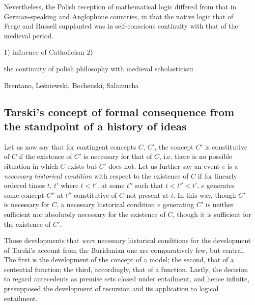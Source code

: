 \documentclass[]{article}
\begin{document}

Nevertheless, the Polish reception of mathematical logic differed from that in German-speaking and Anglophone countries, in that the native logic that of Frege and Russell supplanted was in self-conscious continuity with that of the medieval period.

1) influence of Catholicism
2) 

the continuity of polish philosophy with medieval scholasticism

Brentano, Le\'{s}niewski, Bochenski, Salamucha

\nocite{Moody1952} \nocite{Bochenski1956} 

\subsection{Tarski's concept of formal consequence from the standpoint of a history of ideas}
Let us now say that for contingent concepts $C$, $C'$, the concept $C'$ is constitutive of $C$ if the existence of $C'$ is necessary for that of $C$, i.e. there is no possible situation in which $C$ exists but $C'$ does not. Let us further say an event $e$ is a \textit{necessary historical condition} with respect to the existence of $C$ if for linearly ordered times $t$, $t'$ where $t<t'$, at some $t''$ such that $t<t''<t'$, $e$ generates some concept $C''$ at $t''$ constitutive of $C$ not present at $t$. In this way, though $C'$ is necessary for $C$, a necessary historical condition $e$ generating $C'$ is neither sufficient nor absolutely necessary for the existence of $C$, though it is sufficient for the existence of $C'$.

Those developments that \textit{were} necessary historical conditions for the development of Tarski's account from the Buridanian one are comparatively few, but central. The first is the development of the concept of a model; the second, that of a sentential function; the third, accordingly, that of a function. Lastly, the decision to regard antecedents as premise sets closed under entailment, and hence infinite, presupposed the development of recursion and its application to logical entailment.

\end{document}
